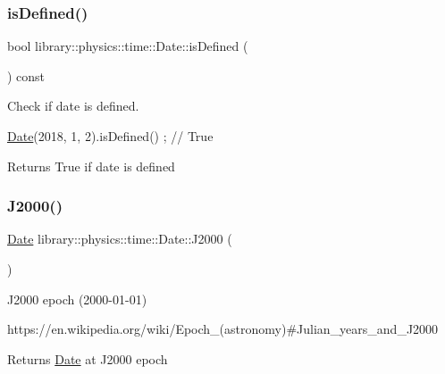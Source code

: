 \subsubsection{\texorpdfstring{is\+Defined()}{isDefined()}}
{\footnotesize\ttfamily bool library\+::physics\+::time\+::\+Date\+::is\+Defined (\begin{DoxyParamCaption}{ }\end{DoxyParamCaption}) const}



Check if date is defined. 


\begin{DoxyCode}
\hyperlink{classlibrary_1_1physics_1_1time_1_1_date_a08e7d804b40b1bfaacbccd32cf79f292}{Date}(2018, 1, 2).isDefined() ; \textcolor{comment}{// True}
\end{DoxyCode}


\begin{DoxyReturn}{Returns}
True if date is defined 
\end{DoxyReturn}
\mbox{\label{classlibrary_1_1physics_1_1time_1_1_date_a9de63332b2eba91b697e7fa6bfbdf1c1}} 
\subsubsection{\texorpdfstring{J2000()}{J2000()}}
{\footnotesize\ttfamily \hyperlink{classlibrary_1_1physics_1_1time_1_1_date}{Date} library\+::physics\+::time\+::\+Date\+::\+J2000 (\begin{DoxyParamCaption}{ }\end{DoxyParamCaption})\hspace{0.3cm}{\ttfamily [static]}}



J2000 epoch (2000-\/01-\/01) 

https\+://en.wikipedia.\+org/wiki/\+Epoch\+\_\+(astronomy)\#\+Julian\+\_\+years\+\_\+and\+\_\+\+J2000

\begin{DoxyReturn}{Returns}
\hyperlink{classlibrary_1_1physics_1_1time_1_1_date}{Date} at J2000 epoch 
\end{DoxyReturn}
\mbox{\label{classlibrary_1_1physics_1_1time_1_1_date_adc0035184464f547f8c9528267109f0a}} 
